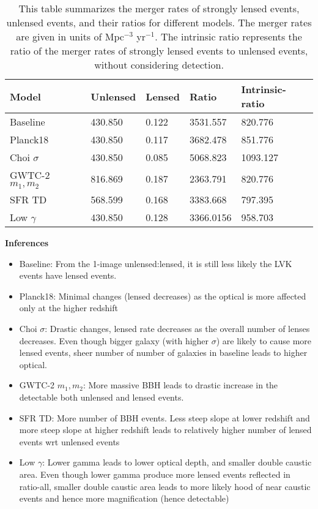 \documentclass[aps,prd,twocolumn,superscriptaddress,groupedaddress,nofootinbib,showpacs,eqsecnum]{revtex4-1}
\begin{document}
\begin{center}
\begin{table}[ht!]
\begin{tabular}{lllll}
Model            & Unlensed & Lensed & Ratio     & Intrinsic-ratio \\
\hline\hline
Baseline         & 430.850  & 0.122  & 3531.557  & 820.776         \\
Planck18         & 430.850  & 0.117  & 3682.478  & 851.776         \\
Choi $\sigma$    & 430.850  & 0.085  & 5068.823  & 1093.127        \\
GWTC-2 $m_1,m_2$ & 816.869  & 0.187  & 2363.791  & 820.776         \\
SFR TD           & 568.599  & 0.168  & 3383.668  & 797.395         \\
Low $\gamma$      & 430.850  & 0.128  & 3366.0156 & 958.703        
\end{tabular}
\caption{
  This table summarizes the merger rates of strongly lensed events, unlensed events, and their ratios for different models. The merger rates are given in units of Mpc$^{-3}$ yr$^{-1}$. The intrinsic ratio represents the ratio of the merger rates of strongly lensed events to unlensed events, without considering detection.
  }
\end{table}
\end{center}

{\bf Inferences}
\begin{itemize}
  \item Baseline: From the 1-image unlensed:lensed, it is still less likely the LVK  events have lensed events.
  \item Planck18: Minimal changes (lensed decreases) as the optical is more affected only at the higher redshift
  \item Choi $\sigma$: Drastic changes, lensed rate decreases as the overall number of lenses decreases. Even though bigger galaxy (with higher $\sigma$) are likely to cause more lensed events, sheer number of number of galaxies in baseline leads to higher optical.
  \item GWTC-2 $m_1,m_2$: More massive BBH leads to drastic increase in the detectable both unlensed and lensed events.
  \item SFR TD: More number of BBH events. Less steep slope at lower redshift and more steep slope at higher redshift leads to relatively higher number of lensed events wrt unlensed events
  \item Low $\gamma$: Lower gamma leads to lower optical depth, and smaller double caustic area. Even though lower gamma produce more lensed events reflected in ratio-all, smaller double caustic area leads to more likely hood of near caustic events and hence more magnification (hence detectable)
\end{itemize}
\end{document}
